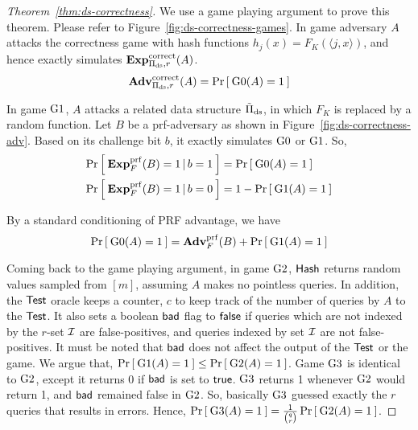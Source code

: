 \newcommand{\FK}{F_K(\langle j,x \rangle)}
\newcommand{\rhoK}{\rho(\langle j,x \rangle)}
\newcommand{\OK}{\calO(\langle j,x \rangle)}

\begin{proof}[Theorem~\ref{thm:ds-correctness}]
We use a game playing argument to prove this theorem. Please refer to
Figure~\ref{fig:ds-correctness-games}. In game  adversary $A$ attacks the correctness game with hash functions $h_j(x) = \FK $, and hence exactly simulates $\mathrm{\mathbf{Exp}}^{\mathrm{correct}}_{\Pi_{\mathrm{ds}},r}(A)$.
\begin{equation}
\mathrm{\mathbf{Adv}}^{\mathrm{correct}}_{\Pi_{\mathrm{ds}},r}(A) = \Pr\left[\: \text{G0}(A)=1 \:\right]
\end{equation}

In game $\text{G1}$, $A$ attacks a related data structure $\tilde{\Pi}_\mathrm{ds}$, in which $F_K$ is replaced by a random function. Let $B$ be a prf-adversary as shown in Figure~\ref{fig:ds-correctness-adv}. Based on its challenge bit $b$, it exactly simulates $\text{G0}$ or $\text{G1}$. So,
\begin{align*}
\Pr\left[\: \mathbf{Exp}^{\mathrm{prf}}_{F}(B) = 1\,|\,b=1 \:\right] &= \Pr\left[\: \text{G0}(A)=1 \:\right] \\
\Pr\left[\: \mathbf{Exp}^{\mathrm{prf}}_{F}(B) = 1\,|\,b=0 \:\right] &= 1-\Pr\left[\: \text{G1}(A)=1 \:\right]
\end{align*}

By a standard conditioning of PRF advantage, we have
\begin{equation*}
\Prob{\game{0}(A)=1} = \AdvPRF{F}{B} + \Prob{\game{1}(A)=1}%
\end{equation*}

Coming back to the game playing argument, in game $\text{G2}$, $\mathsf{Hash}$ returns random values sampled from $[m]$, assuming $A$ makes no pointless queries. In addition, the $\mathsf{Test}$ oracle keeps a counter, $c$ to keep track of the number of queries by $A$ to the $\mathsf{Test}$. It also sets a boolean $\mathsf{bad}$ flag to $\mathsf{false}$ if queries which are not indexed by the $r$-set ${\cal I}$ are false-positives, and queries indexed by set ${\cal I}$ are not false-positives. It must be noted that $\mathsf{bad}$ does not affect the output of the $\mathsf{Test}$ or the game. We argue that, $\Pr\left[\: \text{G1}(A)=1 \:\right] \leq \Pr\left[\: \text{G2}(A)=1 \:\right]$. Game $\text{G3}$ is identical to $\text{G2}$, except it returns 0 if $\mathsf{bad}$ is set to $\mathsf{true}$. $\text{G3}$ returns 1 whenever $\text{G2}$ would return 1, and $\mathsf{bad}$ remained false in $\text{G2}$. So, basically $\text{G3}$ guessed exactly the $r$ queries that results in errors. Hence, $\Pr\left[\: \text{G3}(A)=1 \:\right] = \frac{1}{\binom{q}{r}}\Pr\left[\: \text{G2}(A)=1 \:\right]$.


\end{proof}
